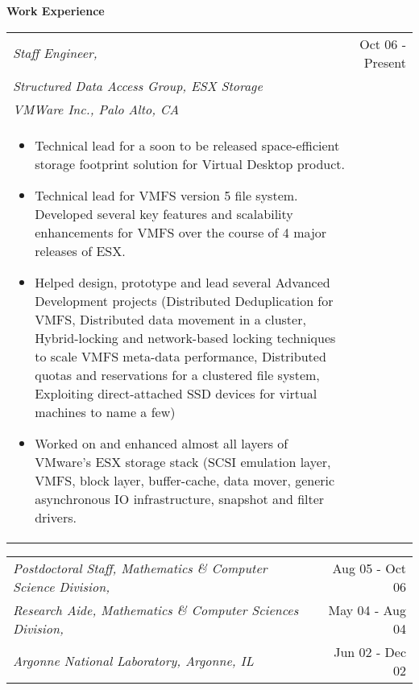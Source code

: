 \documentclass{article}
\begin{document}
\vspace*{-0.1truein}
  \large \textbf{Work Experience}
\vspace*{-0.1truein}

  \begin{center}
         \normalsize
	\begin{tabularx}{6.2in}{Xr}
	\emph{Staff Engineer, } & Oct 06 - Present \\
	\emph{Structured Data Access Group, ESX Storage} & \\
	\emph{VMWare Inc., Palo Alto, CA} & \\
	\begin{itemize}
	\small
        \item {Technical lead for a soon to be released space-efficient storage footprint solution for 
               Virtual Desktop product.}
	\item {Technical lead for VMFS version 5 file system. Developed
               several key features and scalability enhancements for VMFS over the
               course of 4 major releases of ESX.}
        \item {Helped design, prototype and lead several Advanced Development
               projects (Distributed Deduplication for VMFS, Distributed data
               movement in a cluster, Hybrid-locking and network-based locking techniques to scale VMFS
               meta-data performance, Distributed quotas and reservations for a
               clustered file system, Exploiting direct-attached SSD devices
               for virtual machines to name a few)}
        \item {Worked on and enhanced almost all layers of VMware's ESX storage stack (SCSI emulation layer,
               VMFS, block layer, buffer-cache, data mover, generic asynchronous IO
               infrastructure, snapshot and filter drivers.}
	\end{itemize}
	\end{tabularx}
	\normalsize
	\begin{tabularx}{6.2in}{Xr}
	\emph{Postdoctoral Staff, Mathematics \& Computer Science Division,} & Aug 05 - Oct 06 \\
	\emph{Research Aide, Mathematics \& Computer Sciences Division,} & May 04 - Aug 04	\\
	\emph{Argonne National Laboratory, Argonne, IL} & Jun 02 - Dec 02 \\

\end{tabularx}
\end{center}
\end{document}
